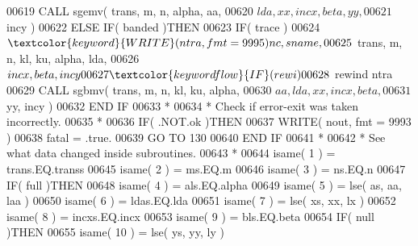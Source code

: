 \begin{DoxyCode}
00619                                  \textcolor{keyword}{CALL }sgemv( trans, m, n, alpha, aa,
00620      $                                       lda, xx, incx, beta, yy,
00621      $                                       incy )
00622                               \textcolor{keywordflow}{ELSE} \textcolor{keywordflow}{IF}( banded )\textcolor{keywordflow}{THEN}
00623                                  \textcolor{keywordflow}{IF}( trace )
00624      $                              \textcolor{keyword}{WRITE}( ntra, fmt = 9995 )nc, sname,
00625      $                              trans, m, n, kl, ku, alpha, lda,
00626      $                              incx, beta, incy
00627                                  \textcolor{keywordflow}{IF}( rewi )
00628      $                              rewind ntra
00629                                  \textcolor{keyword}{CALL }sgbmv( trans, m, n, kl, ku, alpha,
00630      $                                       aa, lda, xx, incx, beta,
00631      $                                       yy, incy )
00632 \textcolor{keywordflow}{                              END IF}
00633 \textcolor{comment}{*}
00634 \textcolor{comment}{*                             Check if error-exit was taken incorrectly.}
00635 \textcolor{comment}{*}
00636                               \textcolor{keywordflow}{IF}( .NOT.ok )\textcolor{keywordflow}{THEN}
00637                                  \textcolor{keyword}{WRITE}( nout, fmt = 9993 )
00638                                  fatal = .true.
00639                                  \textcolor{keywordflow}{GO TO} 130
00640 \textcolor{keywordflow}{                              END IF}
00641 \textcolor{comment}{*}
00642 \textcolor{comment}{*                             See what data changed inside subroutines.}
00643 \textcolor{comment}{*}
00644                               isame( 1 ) = trans.EQ.transs
00645                               isame( 2 ) = ms.EQ.m
00646                               isame( 3 ) = ns.EQ.n
00647                               \textcolor{keywordflow}{IF}( full )\textcolor{keywordflow}{THEN}
00648                                  isame( 4 ) = als.EQ.alpha
00649                                  isame( 5 ) = lse( as, aa, laa )
00650                                  isame( 6 ) = ldas.EQ.lda
00651                                  isame( 7 ) = lse( xs, xx, lx )
00652                                  isame( 8 ) = incxs.EQ.incx
00653                                  isame( 9 ) = bls.EQ.beta
00654                                  \textcolor{keywordflow}{IF}( null )\textcolor{keywordflow}{THEN}
00655                                     isame( 10 ) = lse( ys, yy, ly )

\end{DoxyCode}
